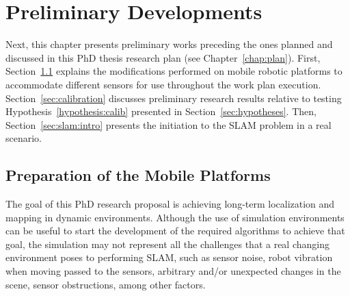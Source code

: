 \chapter{Preliminary Developments}\label{chap:preliminary}

Next, this chapter presents preliminary works preceding the ones planned and discussed in this PhD thesis research plan (see Chapter~\ref{chap:plan}). 
First, Section~\ref{sec:robots} explains the modifications performed on mobile robotic platforms to accommodate different sensors for use throughout the work plan execution. 
Section~\ref{sec:calibration} discusses preliminary research results relative to testing Hypothesis~\ref{hypothesis:calib} presented in Section~\ref{sec:hypotheses}. 
Then, Section~\ref{sec:slam:intro} presents the initiation to the \gls{SLAM} problem in a real scenario.






\section{Preparation of the Mobile Platforms}\label{sec:robots}

The goal of this PhD research proposal is achieving long-term localization and mapping in dynamic environments. Although the use of simulation environments can be useful to start the development of the required algorithms to achieve that goal, the simulation may not represent all the challenges that a real changing environment poses to performing \gls{SLAM}, such as sensor noise, robot vibration when moving passed to the sensors, arbitrary and/or unexpected changes in the scene, sensor obstructions, among other factors.

